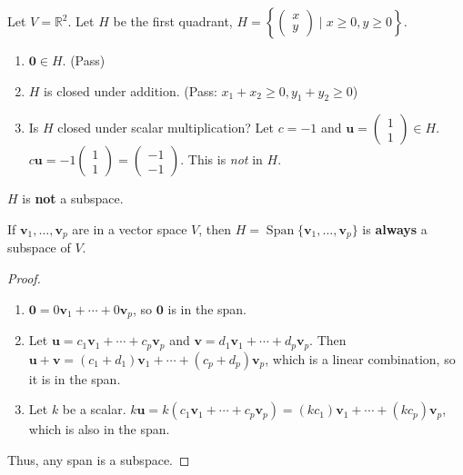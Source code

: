 \begin{example}
Let $V = \mathbb{R}^2$. Let $H$ be the first quadrant, $H = \left\{ \begin{pmatrix} x \\ y \end{pmatrix} \mid x \ge 0, y \ge 0 \right\}$.
\begin{enumerate}
    \item $\mathbf{0} \in H$. (Pass)
    \item $H$ is closed under addition. (Pass: $x_1+x_2 \ge 0, y_1+y_2 \ge 0$)
    \item Is $H$ closed under scalar multiplication? Let $c = -1$ and $\mathbf{u} = \begin{pmatrix} 1 \\ 1 \end{pmatrix} \in H$.
    $c\mathbf{u} = -1 \begin{pmatrix} 1 \\ 1 \end{pmatrix} = \begin{pmatrix} -1 \\ -1 \end{pmatrix}$. This is \emph{not} in $H$.
\end{enumerate}
$H$ is \textbf{not} a subspace.
\end{example}

\begin{theorem}
If $\mathbf{v}_1, \ldots, \mathbf{v}_p$ are in a vector space $V$, then $H = \operatorname{Span}\{\mathbf{v}_1, \ldots, \mathbf{v}_p\}$ is \textbf{always} a subspace of $V$.
\end{theorem}
\begin{proof}
\begin{enumerate}
    \item $\mathbf{0} = 0\mathbf{v}_1 + \cdots + 0\mathbf{v}_p$, so $\mathbf{0}$ is in the span.
    \item Let $\mathbf{u} = c_1\mathbf{v}_1 + \cdots + c_p\mathbf{v}_p$ and $\mathbf{v} = d_1\mathbf{v}_1 + \cdots + d_p\mathbf{v}_p$.
    Then $\mathbf{u} + \mathbf{v} = (c_1+d_1)\mathbf{v}_1 + \cdots + (c_p+d_p)\mathbf{v}_p$, which is a linear combination, so it is in the span.
    \item Let $k$ be a scalar. $k\mathbf{u} = k(c_1\mathbf{v}_1 + \cdots + c_p\mathbf{v}_p) = (kc_1)\mathbf{v}_1 + \cdots + (kc_p)\mathbf{v}_p$, which is also in the span.
\end{enumerate}
Thus, any span is a subspace.
\end{proof}

